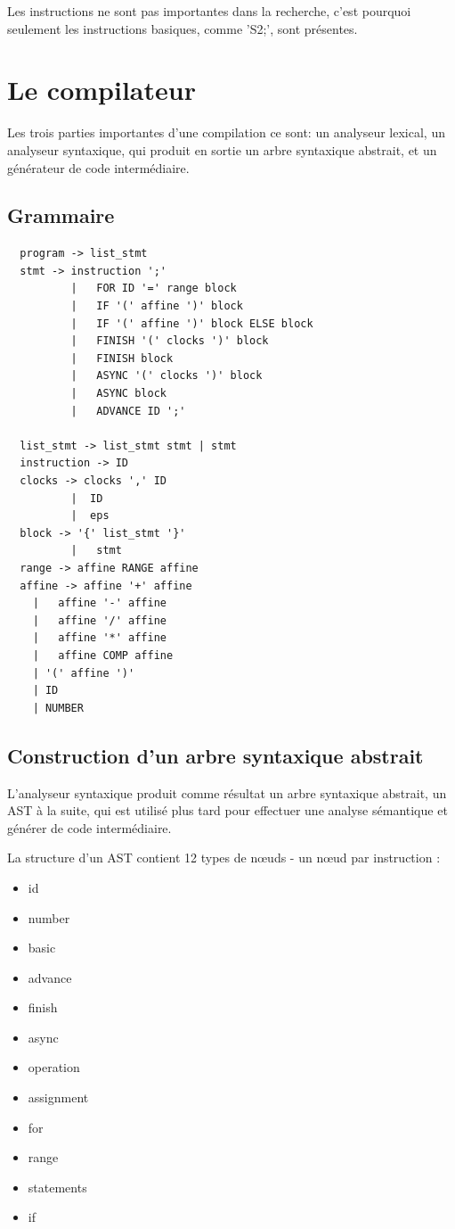 \documentclass[12pt]{scrartcl}
\begin{document}
\begin{description}[itemsep=2em]
Les instructions ne sont pas importantes dans la recherche, c'est pourquoi seulement les instructions basiques, comme 'S2;', sont présentes.
\end{description}
\newpage

\section{Le compilateur}
Les trois parties importantes d'une compilation ce sont: un analyseur lexical, un analyseur syntaxique,
 qui produit en sortie un arbre syntaxique abstrait, et un générateur de code intermédiaire.

\subsection{Grammaire}
\begin{lstlisting}
  program -> list_stmt
  stmt -> instruction ';' 
          |   FOR ID '=' range block 
          |   IF '(' affine ')' block  
          |   IF '(' affine ')' block ELSE block
          |   FINISH '(' clocks ')' block
          |   FINISH block
          |   ASYNC '(' clocks ')' block
          |   ASYNC block
          |   ADVANCE ID ';'

  list_stmt -> list_stmt stmt | stmt
  instruction -> ID
  clocks -> clocks ',' ID
          |  ID
          |  eps
  block -> '{' list_stmt '}'
          |   stmt
  range -> affine RANGE affine
  affine -> affine '+' affine
    |   affine '-' affine
    |   affine '/' affine
    |   affine '*' affine
    |   affine COMP affine
    | '(' affine ')'
    | ID
    | NUMBER
\end{lstlisting}
\newpage

\subsection{Construction d'un arbre syntaxique abstrait}
L'analyseur syntaxique produit comme résultat un arbre syntaxique abstrait, un AST à la suite, 
qui est utilisé plus tard pour effectuer une analyse sémantique et générer de code intermédiaire.

La structure d'un AST contient 12 types de nœuds - un nœud par instruction  : 
\begin{itemize} 
  \item id
  \item number
  \item basic
  \item advance
  \item finish
  \item async
  \item operation
  \item assignment
  \item for 
  \item range
  \item statements
  \item if
\end{itemize}
\end{document}
